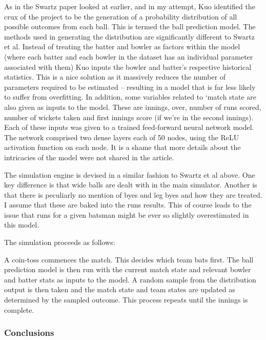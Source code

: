 As in the Swartz paper looked at earlier, and in my attempt, Kuo identified the crux of the project to be the generation of a probability distribution of all possible outcomes from each ball. This is termed the ball prediction model. The methods used in generating the distribution are significantly different to Swartz et al. Instead of treating the batter and bowler as factors within the model (where each batter and each bowler in the dataset has an individual parameter associated with them) Kuo inputs the bowler and batter’s respective historical statistics. This is a nice solution as it massively reduces the number of parameters required to be estimated – resulting in a model that is far less likely to suffer from overfitting. \cite{everitt_cambridge_2010} In addition, some variables related to ‘match state are also given as inputs to the model. These are innings, over, number of runs scored, number of wickets taken and first innings score (if we’re in the second innings). Each of these inputs was given to a trained feed-forward neural network model. The network comprised two dense layers each of 50 nodes, using the ReLU activation function on each node. It is a shame that more details about the intricacies of the model were not shared in the article.

The simulation engine is devised in a similar fashion to Swartz et al above. One key difference is that wide balls are dealt with in the main simulator. Another is that there is peculiarly no mention of byes and leg byes and how they are treated. I assume that these are baked into the runs results. This of course leads to the issue that runs for a given batsman might be ever so slightly overestimated in this model.\footnotemark{}


The simulation proceeds as follows:

A coin-toss commences the match. This decides which team bats first. The ball prediction model is then run with the current match state and relevant bowler and batter stats as inputs to the model. A random sample from the distribution output is then taken and the match state and team states are updated as determined by the sampled outcome. This process repeats until the innings is complete.

\subsubsection{Conclusions}

